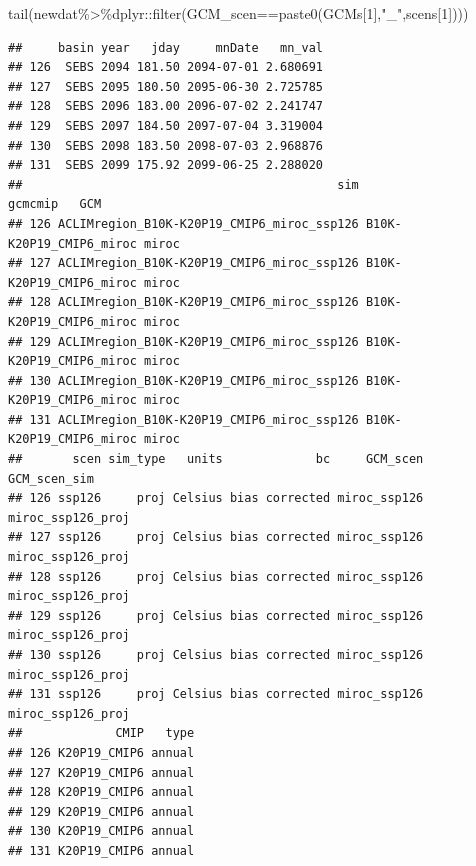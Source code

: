 \documentclass[
]{article}
\newenvironment{Shaded}{\begin{snugshade}}{\end{snugshade}}
\newcommand{\DecValTok}[1]{\textcolor[rgb]{0.00,0.00,0.81}{#1}}
\newcommand{\FunctionTok}[1]{\textcolor[rgb]{0.00,0.00,0.00}{#1}}
\newcommand{\NormalTok}[1]{#1}
\newcommand{\SpecialCharTok}[1]{\textcolor[rgb]{0.00,0.00,0.00}{#1}}
\newcommand{\StringTok}[1]{\textcolor[rgb]{0.31,0.60,0.02}{#1}}
\begin{document}
\begin{Shaded}
\begin{Highlighting}[]
\FunctionTok{tail}\NormalTok{(newdat}\SpecialCharTok{\%\textgreater{}\%}\NormalTok{dplyr}\SpecialCharTok{::}\FunctionTok{filter}\NormalTok{(GCM\_scen}\SpecialCharTok{==}\FunctionTok{paste0}\NormalTok{(GCMs[}\DecValTok{1}\NormalTok{],}\StringTok{"\_"}\NormalTok{,scens[}\DecValTok{1}\NormalTok{])))}
\end{Highlighting}
\end{Shaded}

\begin{verbatim}
##     basin year   jday     mnDate   mn_val
## 126  SEBS 2094 181.50 2094-07-01 2.680691
## 127  SEBS 2095 180.50 2095-06-30 2.725785
## 128  SEBS 2096 183.00 2096-07-02 2.241747
## 129  SEBS 2097 184.50 2097-07-04 3.319004
## 130  SEBS 2098 183.50 2098-07-03 2.968876
## 131  SEBS 2099 175.92 2099-06-25 2.288020
##                                            sim                 gcmcmip   GCM
## 126 ACLIMregion_B10K-K20P19_CMIP6_miroc_ssp126 B10K-K20P19_CMIP6_miroc miroc
## 127 ACLIMregion_B10K-K20P19_CMIP6_miroc_ssp126 B10K-K20P19_CMIP6_miroc miroc
## 128 ACLIMregion_B10K-K20P19_CMIP6_miroc_ssp126 B10K-K20P19_CMIP6_miroc miroc
## 129 ACLIMregion_B10K-K20P19_CMIP6_miroc_ssp126 B10K-K20P19_CMIP6_miroc miroc
## 130 ACLIMregion_B10K-K20P19_CMIP6_miroc_ssp126 B10K-K20P19_CMIP6_miroc miroc
## 131 ACLIMregion_B10K-K20P19_CMIP6_miroc_ssp126 B10K-K20P19_CMIP6_miroc miroc
##       scen sim_type   units             bc     GCM_scen      GCM_scen_sim
## 126 ssp126     proj Celsius bias corrected miroc_ssp126 miroc_ssp126_proj
## 127 ssp126     proj Celsius bias corrected miroc_ssp126 miroc_ssp126_proj
## 128 ssp126     proj Celsius bias corrected miroc_ssp126 miroc_ssp126_proj
## 129 ssp126     proj Celsius bias corrected miroc_ssp126 miroc_ssp126_proj
## 130 ssp126     proj Celsius bias corrected miroc_ssp126 miroc_ssp126_proj
## 131 ssp126     proj Celsius bias corrected miroc_ssp126 miroc_ssp126_proj
##             CMIP   type
## 126 K20P19_CMIP6 annual
## 127 K20P19_CMIP6 annual
## 128 K20P19_CMIP6 annual
## 129 K20P19_CMIP6 annual
## 130 K20P19_CMIP6 annual
## 131 K20P19_CMIP6 annual
\end{verbatim}
\end{document}
